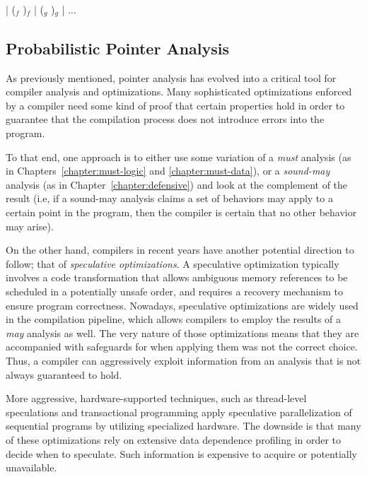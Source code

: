 \begin{displayquote}
\begin{datalog}
 \dlIfInv{}  | ($_f$  )$_f$ | ($_g$  )$_g$ | ...
\end{datalog}
\end{displayquote}


\subsection{Probabilistic Pointer Analysis}

As previously mentioned, pointer analysis has evolved into a critical tool for compiler analysis and optimizations. Many sophisticated optimizations enforced by a compiler need some kind of proof that certain properties hold in order to guarantee that the compilation process does not introduce errors into the program.

To that end, one approach is to either use some variation of a \emph{must} analysis (as in Chapters~\ref{chapter:must-logic} and \ref{chapter:must-data}), or a \emph{sound-may} analysis (as in Chapter~\ref{chapter:defensive}) and look at the complement of the result (i.e, if a sound-may analysis claims a set of behaviors may apply to a certain point in the program, then the compiler is certain that no other behavior may arise).

On the other hand, compilers in recent years have another potential direction to follow; that of \emph{speculative optimizations}. A speculative optimization typically involves a code transformation that allows ambiguous memory references to be scheduled in a potentially unsafe order, and requires a recovery mechanism to ensure program correctness. Nowadays, speculative optimizations are widely used in the compilation pipeline, which allows compilers to employ the results of a \emph{may} analysis as well. The very nature of those optimizations means that they are accompanied with safeguards for when applying them was not the correct choice. Thus, a compiler can aggressively exploit information from an analysis that is not always guaranteed to hold.

More aggressive, hardware-supported techniques, such as thread-level speculations \todo{} and transactional programming \todo{} apply speculative parallelization of sequential programs by utilizing specialized hardware. The downside is that many of these optimizations rely on extensive data dependence profiling in order to decide when to speculate. Such information is expensive to acquire or potentially unavailable.


